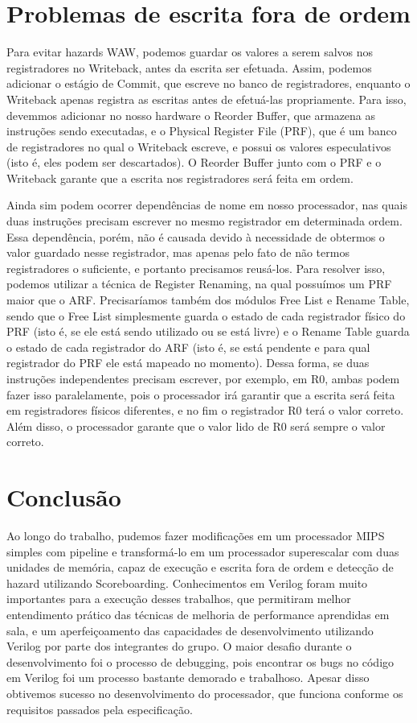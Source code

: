 \documentclass[12pt,a4paper]{article}
\numberwithin{equation}{section}
\begin{document}
\section{Problemas de escrita fora de ordem}

Para evitar hazards WAW, podemos guardar os valores a serem salvos nos registradores no Writeback, antes da escrita ser efetuada. Assim, podemos adicionar o estágio de Commit, que escreve no banco de registradores, enquanto o Writeback apenas registra as escritas antes de efetuá-las propriamente. Para isso, devemmos adicionar no nosso hardware o Reorder Buffer, que armazena as instruções sendo executadas, e o Physical Register File (PRF), que é um banco de registradores no qual o Writeback escreve, e possui os valores especulativos (isto é, eles podem ser descartados). O Reorder Buffer junto com o PRF e o Writeback garante que a escrita nos registradores será feita em ordem.

Ainda sim podem ocorrer dependências de nome em nosso processador, nas quais duas instruções precisam escrever no mesmo registrador em determinada ordem. Essa dependência, porém, não é causada devido à necessidade de obtermos o valor guardado nesse registrador, mas apenas pelo fato de não termos registradores o suficiente, e portanto precisamos reusá-los. Para resolver isso, podemos utilizar a técnica de Register Renaming, na qual possuímos um PRF maior que o ARF. Precisaríamos também dos módulos Free List e Rename Table, sendo que o Free List simplesmente guarda o estado de cada registrador físico do PRF (isto é, se ele está sendo utilizado ou se está livre) e o Rename Table guarda o estado de cada registrador do ARF (isto é, se está pendente e para qual registrador do PRF ele está mapeado no momento). Dessa forma, se duas instruções independentes precisam escrever, por exemplo, em R0, ambas podem fazer isso paralelamente, pois o processador irá garantir que a escrita será feita em registradores físicos diferentes, e no fim o registrador R0 terá o valor correto. Além disso, o processador garante que o valor lido de R0 será sempre o valor correto.

\section{Conclusão}

Ao longo do trabalho, pudemos fazer modificações em um processador MIPS simples com pipeline e transformá-lo em um processador superescalar com duas unidades de memória, capaz de execução e escrita fora de ordem e detecção de hazard utilizando Scoreboarding. Conhecimentos em Verilog foram muito importantes para a execução desses trabalhos, que permitiram melhor entendimento prático das técnicas de melhoria de performance aprendidas em sala, e um aperfeiçoamento das capacidades de desenvolvimento utilizando Verilog por parte dos integrantes do grupo. O maior desafio durante o desenvolvimento foi o processo de debugging, pois encontrar os bugs no código em Verilog foi um processo bastante demorado e trabalhoso. Apesar disso obtivemos sucesso no desenvolvimento do processador, que funciona conforme os requisitos passados pela especificação.
\end{document}
